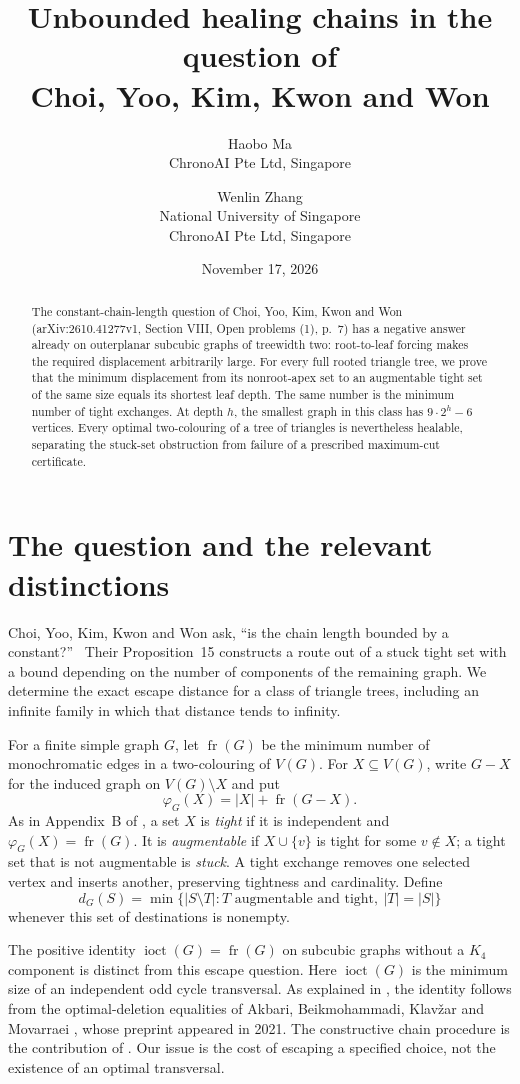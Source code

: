 \documentclass[11pt]{article}
\title{Unbounded healing chains in the question of\\
Choi, Yoo, Kim, Kwon and Won}
\author{Haobo Ma\\\small ChronoAI Pte Ltd, Singapore
\and Wenlin Zhang\\\small National University of Singapore\\
\small ChronoAI Pte Ltd, Singapore}
\date{November 17, 2026}
\newcommand{\fr}{\operatorname{fr}}
\newcommand{\ioct}{\operatorname{ioct}}
\begin{document}
\maketitle
\begin{abstract}
The constant-chain-length question of Choi, Yoo, Kim, Kwon and Won
(arXiv:2610.41277v1, Section VIII, Open problems (1), p.~7) has a
negative answer already on outerplanar subcubic graphs of treewidth two:
root-to-leaf forcing makes the required displacement arbitrarily large.
For every full rooted triangle tree, we prove that the minimum displacement
from its nonroot-apex set to an augmentable tight set of the same size
equals its shortest leaf depth. The same number is the minimum number of
tight exchanges. At depth $h$, the smallest graph in this class has
$9\cdot2^h-6$ vertices. Every optimal two-colouring of a tree of triangles
is nevertheless healable, separating the stuck-set obstruction from
failure of a prescribed maximum-cut certificate.
\end{abstract}

\section{The question and the relevant distinctions}

Choi, Yoo, Kim, Kwon and Won ask, ``is the chain length bounded by a
constant?''\ \cite[Section VIII, Open problems (1), p.~7]{CYKKW}
Their Proposition~15 constructs a route out of a stuck tight set with a
bound depending on the number of components of the remaining graph.
We determine the exact escape distance for a class of triangle trees,
including an infinite family in which that distance tends to infinity.

For a finite simple graph $G$, let $\fr(G)$ be the minimum number of
monochromatic edges in a two-colouring of $V(G)$. For $X\subseteq V(G)$,
write $G-X$ for the induced graph on $V(G)\setminus X$ and put
\[
 \varphi_G(X)=|X|+\fr(G-X).
\]
As in Appendix~B of \cite{CYKKW}, a set $X$ is \emph{tight} if it is
independent and $\varphi_G(X)=\fr(G)$. It is \emph{augmentable} if
$X\cup\{v\}$ is tight for some $v\notin X$; a tight set that is not
augmentable is \emph{stuck}. A tight exchange removes one selected vertex
and inserts another, preserving tightness and cardinality. Define
\[
 d_G(S)=\min\{|S\setminus T|: T\text{ augmentable and tight},\ |T|=|S|\}
\]
whenever this set of destinations is nonempty.

The positive identity $\ioct(G)=\fr(G)$ on subcubic graphs without a
$K_4$ component is distinct from this escape question. Here $\ioct(G)$
is the minimum size of an independent odd cycle transversal.
As explained in \cite[Section V and Supplement A.1]{CYKKW}, the identity
follows from the optimal-deletion equalities of Akbari, Beikmohammadi,
Klav\v{z}ar and Movarraei \cite[Theorems 1.1 and 4.1]{ABKM}, whose
preprint appeared in 2021. The constructive chain procedure is the
contribution of \cite[Appendix B]{CYKKW}. Our issue is the cost of
escaping a specified choice, not the existence of an optimal transversal.
\end{document}
